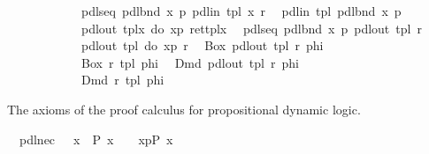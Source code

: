 \begin{isabellebody}
\ \ \ \ \ \ \ \ \ \ {\isasymrightharpoonup}\ \ {\isachardoublequote}{\isacharunderscore}pdlseq\ {\isacharparenleft}{\isacharunderscore}pdlbnd\ x\ p{\isacharparenright}\ {\isacharparenleft}{\isacharunderscore}pdlin\ {\isacharparenleft}tpl{\isacharcomma}\ x{\isacharparenright}\ r{\isacharparenright}{\isachardoublequote}\isanewline
\ \ {\isachardoublequote}{\isacharunderscore}pdlin\ tpl\ {\isacharparenleft}{\isacharunderscore}pdlbnd\ x\ p{\isacharparenright}{\isachardoublequote}\isanewline
\ \ \ \ \ \ \ \ \ \ {\isasymrightharpoonup}\ \ {\isachardoublequote}{\isacharunderscore}pdlout\ {\isacharparenleft}tpl{\isacharcomma}x{\isacharparenright}\ {\isacharparenleft}do\ {\isacharbraceleft}x{\isasymleftarrow}p{\isacharsemicolon}\ ret{\isacharparenleft}tpl{\isacharcomma}x{\isacharparenright}{\isacharbraceright}{\isacharparenright}{\isachardoublequote}\isanewline
\ \ {\isachardoublequote}{\isacharunderscore}pdlseq\ {\isacharparenleft}{\isacharunderscore}pdlbnd\ x\ p{\isacharparenright}\ {\isacharparenleft}{\isacharunderscore}pdlout\ tpl\ r{\isacharparenright}{\isachardoublequote}\isanewline
\ \ \ \ \ \ \ \ \ \ {\isasymrightharpoonup}\ \ {\isachardoublequote}{\isacharunderscore}pdlout\ tpl\ {\isacharparenleft}do\ {\isacharbraceleft}x{\isasymleftarrow}p{\isacharsemicolon}\ r{\isacharbraceright}{\isacharparenright}{\isachardoublequote}\isanewline
\ \ {\isachardoublequote}Box\ {\isacharparenleft}{\isacharunderscore}pdlout\ tpl\ r{\isacharparenright}\ phi{\isachardoublequote}\ \isanewline
\ \ \ \ \ \ \ \ \ \ {\isasymrightharpoonup}\ \ {\isachardoublequote}Box\ r\ {\isacharparenleft}{\isasymlambda}tpl{\isachardot}\ phi{\isacharparenright}{\isachardoublequote}\isanewline
\ \ {\isachardoublequote}Dmd\ {\isacharparenleft}{\isacharunderscore}pdlout\ tpl\ r{\isacharparenright}\ phi{\isachardoublequote}\ \isanewline
\ \ \ \ \ \ \ \ \ \ {\isasymrightharpoonup}\ \ {\isachardoublequote}Dmd\ r\ {\isacharparenleft}{\isasymlambda}tpl{\isachardot}\ phi{\isacharparenright}{\isachardoublequote}\isamarkupfalse%
%
\begin{isamarkuptext}%
The axioms of the proof calculus for propositional dynamic logic.%
\end{isamarkuptext}%
\isamarkuptrue%
\isanewline
\ \ pdl{\isacharunderscore}nec{\isacharcolon}\ \ \ {\isachardoublequote}{\isacharparenleft}{\isasymforall}x{\isachardot}\ {\isasymturnstile}\ P\ x{\isacharparenright}\ {\isasymLongrightarrow}\ {\isasymturnstile}\ {\isacharbrackleft}{\isacharhash}\ x{\isasymleftarrow}p{\isacharbrackright}{\isacharparenleft}P\ x{\isacharparenright}{\isachardoublequote}\isanewline

\end{isabellebody}
